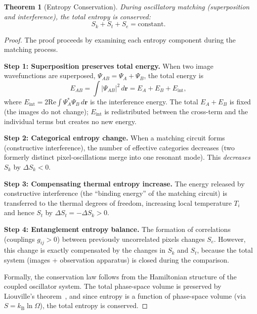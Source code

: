 \documentclass[11pt,twocolumn,a4paper]{article}
\newtheorem{theorem}{Theorem}[section]
\newcommand{\kb}{k_{\mathrm{B}}}
\newcommand{\Sk}{S_k}
\newcommand{\St}{S_t}
\newcommand{\Se}{S_e}
\begin{document}
\begin{theorem}[Entropy Conservation]\label{thm:entropy_conservation}
During oscillatory matching (superposition and interference), the total entropy is conserved:
\begin{equation}
    \Sk + \St + \Se = \text{constant}.
    \label{eq:entropy_conservation}
\end{equation}
\end{theorem}

\begin{proof}
The proof proceeds by examining each entropy component during the matching process.

\noindent\textbf{Step 1: Superposition preserves total energy.}
When two image wavefunctions are superposed, $\Psi_{AB} = \Psi_A + \Psi_B$, the total energy is
\begin{equation}
    E_{AB} = \int |\Psi_{AB}|^2 \, d\bm{r} = E_A + E_B + E_{\text{int}},
\end{equation}
where $E_{\text{int}} = 2\text{Re}\int \Psi_A^* \Psi_B \, d\bm{r}$ is the interference energy. The total $E_A + E_B$ is fixed (the images do not change); $E_{\text{int}}$ is redistributed between the cross-term and the individual terms but creates no new energy.

\noindent\textbf{Step 2: Categorical entropy change.}
When a matching circuit forms (constructive interference), the number of effective categories decreases (two formerly distinct pixel-oscillations merge into one resonant mode). This \emph{decreases} $\Sk$ by $\Delta \Sk < 0$.

\noindent\textbf{Step 3: Compensating thermal entropy increase.}
The energy released by constructive interference (the ``binding energy'' of the matching circuit) is transferred to the thermal degrees of freedom, increasing local temperature $T_i$ and hence $\St$ by $\Delta \St = -\Delta \Sk > 0$.

\noindent\textbf{Step 4: Entanglement entropy balance.}
The formation of correlations (couplings $g_{ij} > 0$) between previously uncorrelated pixels changes $\Se$. However, this change is exactly compensated by the changes in $\Sk$ and $\St$, because the total system (images + observation apparatus) is closed during the comparison.

Formally, the conservation law follows from the Hamiltonian structure of the coupled oscillator system. The total phase-space volume is preserved by Liouville's theorem~\citep{liouville1838, arnold1989}, and since entropy is a function of phase-space volume (via $S = \kb \ln \Omega$), the total entropy is conserved.
\end{proof}
\end{document}
